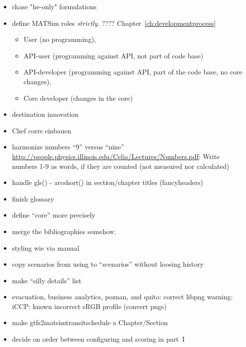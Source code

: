 \begin{itemize}

\item chase "he-only" formulations

\item define MATSim roles \emph{strictly}. ???? Chapter~\ref{ch:developmentprocess}
\begin{itemize}
\item User (no programming), 
\item API-user (programming against API, not part of code base) 
\item API-developer (programming against API, part of the code base, no core changes), 
\item Core developer (changes in the core)
\end{itemize}

\item destination innovation

\item Chef corrs einbauen

\item harmonize numbers ``9'' versus ``nine'' \url{http://people.physics.illinois.edu/Celia/Lectures/Numbers.pdf}: Write numbers 1-9 as words, if they are counted (not measured nor calculated)

\item handle gls() - arcshort() in section/chapter titles (fancyheaders)

\item finish glossary

\item define ``core'' more precisely

\item merge the bibliographies somehow.

\item styling wie via manual

\item copy scenarios from using to ``scenarios'' without loosing history

\item make ``silly details'' list

\item evacuation, business analytics, poznan, and quito: correct libpng warning: iCCP: known incorrect sRGB profile (convert pngs)

\item make gtfs2matsimtransitschedule a Chapter/Section

\item decide on order between configuring and scoring in part~I

\end{itemize}

